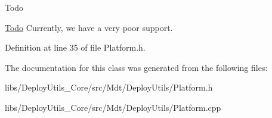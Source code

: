 \begin{DoxyRefDesc}{Todo}
\item[\hyperlink{todo__todo000005}{Todo}]Currently, we have a very poor support. \end{DoxyRefDesc}


Definition at line 35 of file Platform.\+h.



The documentation for this class was generated from the following files\+:\begin{DoxyCompactItemize}
\item 
libs/\+Deploy\+Utils\+\_\+\+Core/src/\+Mdt/\+Deploy\+Utils/Platform.\+h\item 
libs/\+Deploy\+Utils\+\_\+\+Core/src/\+Mdt/\+Deploy\+Utils/Platform.\+cpp\end{DoxyCompactItemize}
